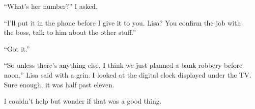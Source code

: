 ``What's her number?'' I asked.



``I'll put it in the phone before I give it to you.  Lisa?  You confirm the job with the boss, talk to him about the other stuff.''



``Got it.''



``So unless there's anything else, I think we just planned a bank robbery before noon,'' Lisa said with a grin.  I looked at the digital clock displayed under the TV.  Sure enough, it was half past eleven.



I couldn't help but wonder if that was a good thing.






